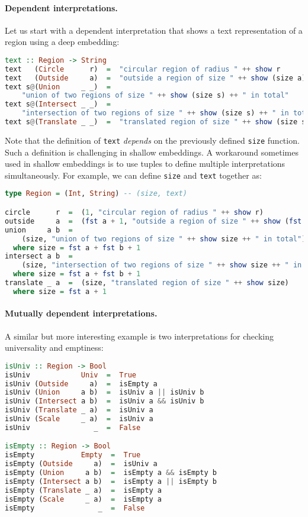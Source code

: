 \paragraph{Dependent interpretations.}
Let us start with a dependent interpretation that shows a text representation of
a region using a deep embedding:

\begin{lstlisting}[language=Haskell]
text :: Region -> String
text   (Circle      r)  =  "circular region of radius " ++ show r
text   (Outside     a)  =  "outside a region of size " ++ show (size a)
text s@(Union     _ _)  =
    "union of two regions of size " ++ show (size s) ++ " in total"
text s@(Intersect _ _)  =
    "intersection of two regions of size " ++ show (size s) ++ " in total"
text s@(Translate _ _)  =  "translated region of size " ++ show (size s)
\end{lstlisting}

\noindent
Note that the definition of \lstinline{text} \emph{depends} on the previously
defined \lstinline{size} function. Such a definition is challenging in shallow
embeddings. A workaround sometimes used in shallow embeddings is to use tuples
to define multiple interpretations simultaneously. For example, we can define
\lstinline{size} and \lstinline{text} together as:

\begin{lstlisting}[language=Haskell,deletekeywords={union,intersect}]
type Region = (Int, String) -- (size, text)

circle      r  =  (1, "circular region of radius " ++ show r)
outside     a  =  (fst a + 1, "outside a region of size " ++ show (fst a))
union     a b  =
    (size, "union of two regions of size " ++ show size ++ " in total")
  where size = fst a + fst b + 1
intersect a b  =
    (size, "intersection of two regions of size " ++ show size ++ " in total")
  where size = fst a + fst b + 1
translate _ a  =  (size, "translated region of size " ++ show size)
  where size = fst a + 1
\end{lstlisting}

\paragraph{Mutually dependent interpretations.} \label{sec:mutual}
A similar but more interesting example is two interpretations for checking
universality and emptiness:

\begin{lstlisting}[language=Haskell]
isUniv :: Region -> Bool
isUniv            Univ  =  True
isUniv (Outside     a)  =  isEmpty a
isUniv (Union     a b)  =  isUniv a || isUniv b
isUniv (Intersect a b)  =  isUniv a && isUniv b
isUniv (Translate _ a)  =  isUniv a
isUniv (Scale     _ a)  =  isUniv a
isUniv               _  =  False

isEmpty :: Region -> Bool
isEmpty           Empty  =  True
isEmpty (Outside     a)  =  isUniv a
isEmpty (Union     a b)  =  isEmpty a && isEmpty b
isEmpty (Intersect a b)  =  isEmpty a || isEmpty b
isEmpty (Translate _ a)  =  isEmpty a
isEmpty (Scale     _ a)  =  isEmpty a
isEmpty               _  =  False
\end{lstlisting}


